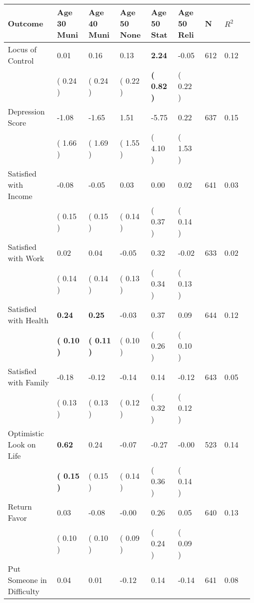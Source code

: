 \begin{tabular}{L{6.2cm} C{1.8cm} C{1.8cm} C{1.8cm} C{1.8cm} C{1.8cm} C{1.8cm} C{0.3cm} C{0.3cm}}
\toprule
 \textbf{Outcome} & \textbf{Age 30 Muni} & \textbf{Age 40 Muni} & \textbf{Age 50 None} & \textbf{Age 50 Stat} & \textbf{Age 50 Reli} & \textbf{N} & \textbf{$ R^2$} \\
\midrule
Locus of Control &      0.01 &      0.16 &      0.13 & \textbf{     2.24} &     -0.05  & 612 &       0.12 \\ 
 & (     0.24 ) & (     0.24 ) & (     0.22 ) & \textbf{(     0.82 )} & (     0.22 )  & \\
Depression Score &     -1.08 &     -1.65 &      1.51 &     -5.75 &      0.22  & 637 &       0.15 \\ 
 & (     1.66 ) & (     1.69 ) & (     1.55 ) & (     4.10 ) & (     1.53 )  & \\
Satisfied with Income &     -0.08 &     -0.05 &      0.03 &      0.00 &      0.02  & 641 &       0.03 \\ 
 & (     0.15 ) & (     0.15 ) & (     0.14 ) & (     0.37 ) & (     0.14 )  & \\
Satisfied with Work &      0.02 &      0.04 &     -0.05 &      0.32 &     -0.02  & 633 &       0.02 \\ 
 & (     0.14 ) & (     0.14 ) & (     0.13 ) & (     0.34 ) & (     0.13 )  & \\
Satisfied with Health & \textbf{     0.24} & \textbf{     0.25} &     -0.03 &      0.37 &      0.09  & 644 &       0.12 \\ 
 & \textbf{(     0.10 )} & \textbf{(     0.11 )} & (     0.10 ) & (     0.26 ) & (     0.10 )  & \\
Satisfied with Family &     -0.18 &     -0.12 &     -0.14 &      0.14 &     -0.12  & 643 &       0.05 \\ 
 & (     0.13 ) & (     0.13 ) & (     0.12 ) & (     0.32 ) & (     0.12 )  & \\
Optimistic Look on Life & \textbf{     0.62} &      0.24 &     -0.07 &     -0.27 &     -0.00  & 523 &       0.14 \\ 
 & \textbf{(     0.15 )} & (     0.15 ) & (     0.14 ) & (     0.36 ) & (     0.14 )  & \\
Return Favor &      0.03 &     -0.08 &     -0.00 &      0.26 &      0.05  & 640 &       0.13 \\ 
 & (     0.10 ) & (     0.10 ) & (     0.09 ) & (     0.24 ) & (     0.09 )  & \\
Put Someone in Difficulty &      0.04 &      0.01 &     -0.12 &      0.14 &     -0.14  & 641 &       0.08 \\ 

\end{tabular}
